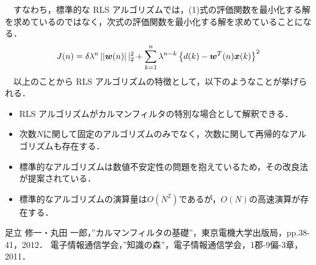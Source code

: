 \documentclass[a4paper,11pt]{jarticle}
\begin{document}
\ \ すなわち，標準的な RLS アルゴリズムでは，(1)式の評価関数を最小化する解を求めているのではなく，次式の評価関数を最小化する解を求めていることになる．
\begin{equation}
 J(n) = \delta \lambda^n \left|| \mbox{\boldmath$w$}(n) \right||^2_2 + \sum^n_{k=1} \lambda ^{n-k} \left\{ d(k) - \mbox{\boldmath$w$}^T(n) \mbox{\boldmath$x$}(k) \right\}^2\end{equation}
\ \ 以上のことから RLS アルゴリズムの特徴として，以下のようなことが挙げられる．
\begin{itemize}
 \item RLS アルゴリズムがカルマンフィルタの特別な場合として解釈できる．
 \item 次数$ N $に関して固定のアルゴリズムのみでなく，次数に関して再帰的なアルゴリズムも存在する．
 \item 標準的なアルゴリズムは数値不安定性の問題を抱えているため，その改良法が提案されている．
 \item 標準的なアルゴリズムの演算量は$ O(N^2) $であるが，$ O(N) $の高速演算が存在する．
\end{itemize}

\begin{thebibliography}{99}
 足立 修一・丸田 一郎，”カルマンフィルタの基礎”，東京電機大学出版局，pp.38-41，2012．
 電子情報通信学会，”知識の森”，電子情報通信学会，1郡-9偏-3章，2011．
\end{thebibliography}
\end{document}

